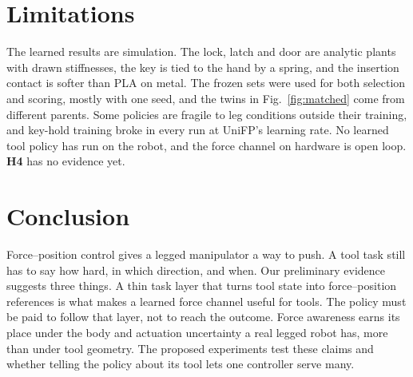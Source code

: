 \documentclass[conference]{IEEEtran}
\newcommand{\hyp}[1]{\textbf{H#1}}
\begin{document}
\section{Limitations}

The learned results are simulation. The lock, latch and door are analytic plants with drawn stiffnesses, the key is
tied to the hand by a spring, and the insertion contact is softer than PLA on metal. The frozen sets were used for both
selection and scoring, mostly with one seed, and the twins in Fig.~\ref{fig:matched} come from different parents. Some
policies are fragile to leg conditions outside their training, and key-hold training broke in every run at UniFP's
learning rate. No learned tool policy has run on the robot, and the force channel on hardware is open loop. \hyp{4} has
no evidence yet.

\section{Conclusion}

Force--position control gives a legged manipulator a way to push. A tool task still has to say how hard, in which
direction, and when. Our preliminary evidence suggests three things. A thin task layer that turns tool state into
force--position references is what makes a learned force channel useful for tools. The policy must be paid to follow
that layer, not to reach the outcome. Force awareness earns its place under the body and actuation uncertainty a real
legged robot has, more than under tool geometry. The proposed experiments test these claims and whether telling the
policy about its tool lets one controller serve many.



\end{document}
